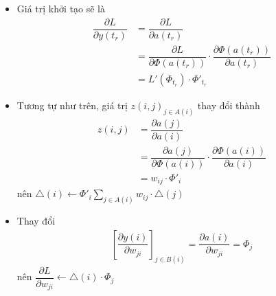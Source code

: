 \begin{enumerate}
          \begin{itemize}
              \item Giá trị khởi tạo sẽ là
                    \begin{align}
                        \dfrac{\partial L}{\partial y(t_r)}
                         & =\dfrac{\partial L}{\partial a(t_r)}                                                        \nonumber \\
                         & =\dfrac{\partial L}{\partial\Phi(a(t_r))}\cdot\dfrac{\partial\Phi(a(t_r))}{\partial a(t_r)} \nonumber \\
                         & =L'(\Phi_{t_r})\cdot\Phi'_{t_r}
                    \end{align}
              \item Tương tự như trên, giá trị $z(i,j)_{j\in A(i)}$ thay đổi thành
                    \begin{align}
                        z(i,j)
                         & =\dfrac{\partial a(j)}{\partial a(i)}                                                    \nonumber \\
                         & =\dfrac{\partial a(j)}{\partial\Phi(a(i))}\cdot\dfrac{\partial\Phi(a(i))}{\partial a(i)} \nonumber \\
                         & =w_{ij}\cdot\Phi'_i
                    \end{align}
                    nên $\triangle(i)\gets\Phi'_i\sum_{j\in A(i)}w_{ij}\cdot\triangle(j)$
              \item Thay đổi
                    \begin{align}
                        \left[\dfrac{\partial y(i)}{\partial w_{ji}}\right]_{j\in B(i)}=\dfrac{\partial a(i)}{\partial w_{ji}}=\Phi_j
                    \end{align}
                    nên $\dfrac{\partial L}{\partial w_{ji}}\gets\triangle(i)\cdot\Phi_j$
          \end{itemize}
\end{enumerate}

